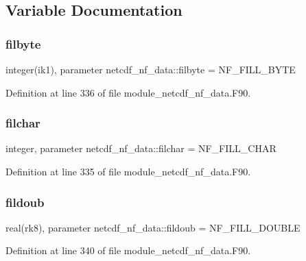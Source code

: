 \subsection{Variable Documentation}
\mbox{\label{namespacenetcdf__nf__data_a17562ee56c26af08b2773cbc1f8ab9f6}} 
\subsubsection{\texorpdfstring{filbyte}{filbyte}}
{\footnotesize\ttfamily integer(ik1), parameter netcdf\+\_\+nf\+\_\+data\+::filbyte = N\+F\+\_\+\+F\+I\+L\+L\+\_\+\+B\+Y\+TE}



Definition at line 336 of file module\+\_\+netcdf\+\_\+nf\+\_\+data.\+F90.

\mbox{\label{namespacenetcdf__nf__data_acbdcbd98efe04141031a6af275d611e8}} 
\subsubsection{\texorpdfstring{filchar}{filchar}}
{\footnotesize\ttfamily integer, parameter netcdf\+\_\+nf\+\_\+data\+::filchar = N\+F\+\_\+\+F\+I\+L\+L\+\_\+\+C\+H\+AR}



Definition at line 335 of file module\+\_\+netcdf\+\_\+nf\+\_\+data.\+F90.

\mbox{\label{namespacenetcdf__nf__data_a177e262787afc3c17e1a0a695e58ecba}} 
\subsubsection{\texorpdfstring{fildoub}{fildoub}}
{\footnotesize\ttfamily real(rk8), parameter netcdf\+\_\+nf\+\_\+data\+::fildoub = N\+F\+\_\+\+F\+I\+L\+L\+\_\+\+D\+O\+U\+B\+LE}



Definition at line 340 of file module\+\_\+netcdf\+\_\+nf\+\_\+data.\+F90.


